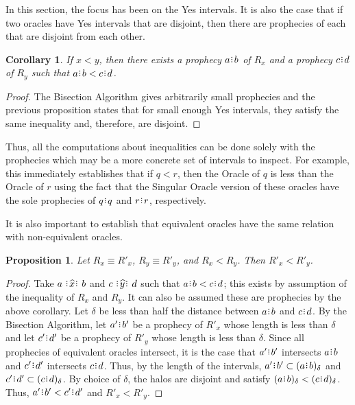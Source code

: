 \documentclass[12pt]{article}
\newtheorem{corollary}{Corollary}[section]
\newtheorem{proposition}{Proposition}[section]
\begin{document}
In this section, the focus has been on the Yes intervals. It is also the case that if two oracles have Yes intervals that are disjoint, then there are prophecies of each that are disjoint from each other.

\begin{corollary}
    If $x < y$, then there exists a prophecy $a\rint b$ of $R_x$ and a prophecy $c\rint d$ of $R_y$ such that $a\rint b < c\rint d$.
\end{corollary}

\begin{proof}
    The Bisection Algorithm gives arbitrarily small prophecies and the previous proposition states that for small enough Yes intervals, they satisfy the same inequality and, therefore, are disjoint. 
\end{proof}

Thus, all the computations about inequalities can be done solely with the prophecies which may be a more concrete set of intervals to inspect. For example, this immediately establishes that if $q < r$, then the Oracle of $q$ is less than the Oracle of $r$ using the fact that the Singular Oracle version of these oracles have the sole prophecies of $q\rint q$ and $r\rint r$, respectively. 

It is also important to establish that equivalent oracles have the same relation with non-equivalent oracles. 

\begin{proposition}
    Let $R_x \equiv R'_{x}$, $R_y \equiv R'_{y}$, and $R_x < R_y$. Then $R'_{x} < R'_{y}$.
\end{proposition}

\begin{proof}
    Take $a \xora b$ and $c \xora[y] d$ such that $a\rint b < c\rint d$; this exists by assumption of the inequality of $R_x$ and $R_y$. It can also be assumed these are prophecies by the above corollary. Let $\delta$ be less than half the distance between $a\rint b$ and $c\rint d$. By the Bisection Algorithm, let $a'\rint b'$ be a prophecy of $R'_x$ whose length is less than $\delta$ and let $c'\rint d'$ be a prophecy of $R'_y$ whose length is less than $\delta$. Since all prophecies of equivalent oracles intersect, it is the case that $a'\rint b'$ intersects $a\rint b$ and $c'\rint d'$ intersects $c\rint d$. Thus, by the length of the intervals, $a'\rint b' \subset \halo{a\rint b}$ and $c'\rint d' \subset \halo{c\rint d}$. By choice of $\delta$, the halos are disjoint and satisfy $\halo{a\rint b} < \halo{c\rint d}$. Thus, $a'\rint b' < c'\rint d'$ and 
    $R'_{x} < R'_{y}$.
\end{proof}
\end{document}
